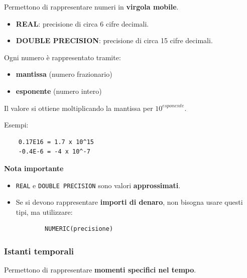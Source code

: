 Permettono di rappresentare numeri in \textbf{virgola mobile}.

\begin{itemize}
	
	\item \textbf{REAL}: precisione di circa 6 cifre decimali.
	
	\item \textbf{DOUBLE PRECISION}: precisione di circa 15 cifre decimali.
	
\end{itemize}

Ogni numero è rappresentato tramite:

\begin{itemize}
	
	\item \textbf{mantissa} (numero frazionario)
	\item \textbf{esponente} (numero intero)
	
\end{itemize}

Il valore si ottiene moltiplicando la mantissa per $10^{esponente}$.

Esempi:

\begin{verbatim}
	0.17E16 = 1.7 x 10^15
	-0.4E-6 = -4 x 10^-7
\end{verbatim}

\textbf{Nota importante}

\begin{itemize}
	
	\item \texttt{REAL} e \texttt{DOUBLE PRECISION} sono valori \textbf{approssimati}.
	\item Se si devono rappresentare \textbf{importi di denaro}, non bisogna usare questi tipi, ma utilizzare:
	
	\begin{verbatim}
		NUMERIC(precisione)
	\end{verbatim}
	
\end{itemize}

\subsubsection*{Istanti temporali}

Permettono di rappresentare \textbf{momenti specifici nel tempo}.

